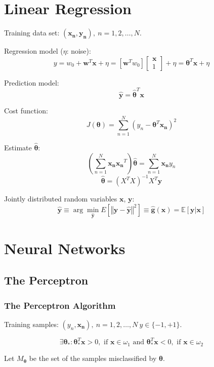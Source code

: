 \documentclass{report}
\begin{document}
\chapter{Linear Regression}

Training data set: $(\symbf{x_n}, \symbf{y_n}),\ n=1, 2, \ldots, N$.

Regression model ($\eta$: noise):
\[y = w_0 + \symbf{w}^T \symbf{x} + \eta = [\symbf{w}^T w_0] \begin{bmatrix}\symbf{x} \\
1\end{bmatrix} + \eta = \symbf{\theta}^T \symbf{x} + \eta\]

Prediction model:
\[\symbf{\hat y} = \symbf{\hat \theta}^T \symbf{x}\]

Cost function:
\[J(\symbf{\theta}) = \sum_{n=1}^N (y_n - \symbf{\theta}^T \symbf{x_n})^2 \]

Estimate $\symbf{\hat \theta}$:
\[\left( \sum_{n=1}^N \symbf{x_n}\symbf{x_n}^T \right) \symbf{\hat \theta} = \sum_{n=1}^N \symbf{x_n} y_n\]
\[\symbf{\hat \theta} = (X^T X)^{-1} X^T \symbf{y}\]

Jointly distributed random variables $\symbf{x}$, $\symbf{y}$:
\[\symbf{\hat y} \equiv \arg\min_{\symbf{\hat y}} E\left[ \left\Vert \symbf{y} - \symbf{\hat y} \right\Vert^2 \right] \equiv \symbf{\hat g}(\symbf{x}) = \mathbb{E}[\symbf{y} | \symbf{x}]\]


\chapter{Neural Networks}

\section*{The Perceptron}

\subsection*{The Perceptron Algorithm}

Training samples: $(y_n, \symbf{x_n}),\ n=1, 2, \ldots, N\ y \in \{-1, +1\}$.

\[\exists \symbf{\theta}_*: \symbf{\theta}_*^T \symbf{x} > 0,\text{ if }\symbf{x} \in \omega_1\text{ and }\symbf{\theta}_*^T \symbf{x} < 0,\text{ if }\symbf{x} \in \omega_2\]

Let $M_{\symbf{\theta}}$ be the set of the samples misclassified by $\symbf{\theta}$.
\end{document}
